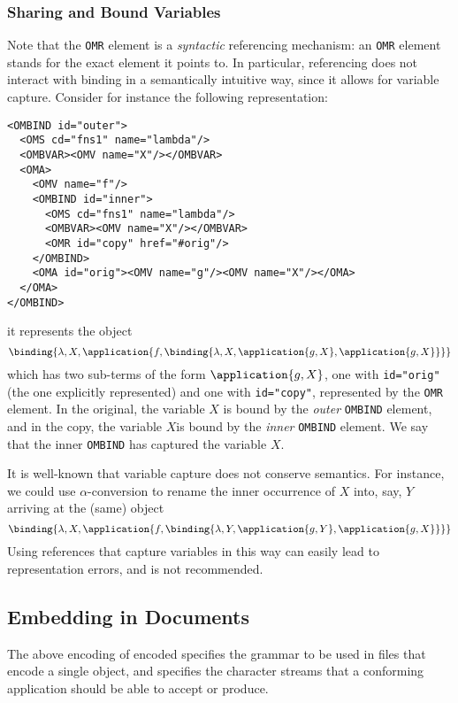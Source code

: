 \subsubsection{Sharing and Bound Variables}\label{sec_sharing_bvars}

Note that the \lstinline|OMR| element is a \emph{syntactic} referencing mechanism: an
\lstinline|OMR| element stands for the exact \XML element it points to. In particular,
referencing does not interact with binding in a semantically intuitive way, since it
allows for variable capture. Consider for instance the following \XML representation:
\begin{lstlisting}
<OMBIND id="outer">
  <OMS cd="fns1" name="lambda"/>
  <OMBVAR><OMV name="X"/></OMBVAR>
  <OMA>
    <OMV name="f"/>
    <OMBIND id="inner">
      <OMS cd="fns1" name="lambda"/>
      <OMBVAR><OMV name="X"/></OMBVAR>
      <OMR id="copy" href="#orig"/>
    </OMBIND>
    <OMA id="orig"><OMV name="g"/><OMV name="X"/></OMA>
  </OMA>
</OMBIND>
\end{lstlisting}
it represents the \OM object
\[\binding{\lambda,X,\application{f,\binding{\lambda,X,\application{g,X},\application{g,X}}}}\]
which has two sub-terms of the form $\application{g,X}$, one with \lstinline|id="orig"|
(the one explicitly represented) and one with \lstinline|id="copy"|, represented by the
\lstinline|OMR| element. In the original, the variable $X$ is bound by the \emph{outer}
\lstinline|OMBIND| element, and in the copy, the variable $X$is bound by the \emph{inner}
\lstinline|OMBIND| element. We say that the inner \lstinline|OMBIND| has captured the
variable $X$.

It is well-known that variable capture does not conserve semantics. For instance, we could
use $\alpha$-conversion to rename the inner occurrence of $X$ into, say, $Y$ arriving at
the (same) object
\[\binding{\lambda,X,\application{f,\binding{\lambda,Y,\application{g,Y},\application{g,X}}}}\]
Using references that capture variables in this way can easily lead to representation
errors, and is not recommended.

\subsection{Embedding \OM in \XML Documents}\label{xmldoc}
     
The above encoding of \XML encoded \OM specifies the grammar to be used in files that
encode a single \OM object, and specifies the character streams that a conforming \OM
application should be able to accept or produce.


